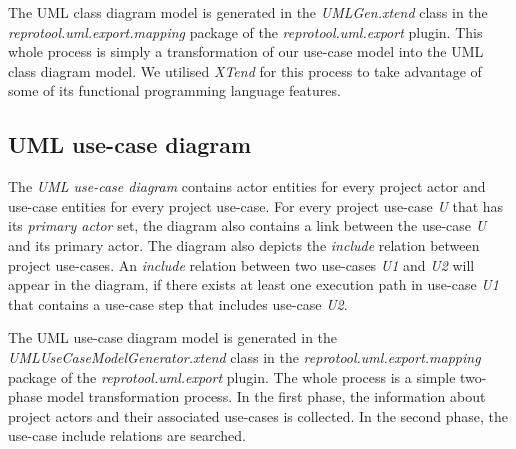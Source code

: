 The UML class diagram model is generated in the \emph{UMLGen.xtend} class in the \emph{reprotool.uml.export.mapping} package of the
\emph{reprotool.uml.export} plugin. This whole process is simply a transformation of our use-case model into the UML class diagram
model. We utilised \emph{XTend} for this process to take advantage of some of its functional programming language features.

\subsection{UML use-case diagram}
The \emph{UML use-case diagram} contains actor entities for every project actor and use-case entities for every project use-case.
For every project use-case \emph{U} that has its \emph{primary actor} set, the diagram also contains a link between the use-case \emph{U}
and its primary actor. The diagram also depicts the \emph{include} relation between project use-cases. An \emph{include} relation between
two use-cases \emph{U1} and \emph{U2} will appear in the diagram, if there exists at least one execution path in use-case \emph{U1}
that contains a use-case step that includes use-case \emph{U2}.

The UML use-case diagram model is generated in the \emph{UMLUseCaseModelGenerator.xtend} class in the \emph{reprotool.uml.export.mapping} package of the
\emph{reprotool.uml.export} plugin. The whole process is a simple two-phase model transformation process. In the first phase, the
information about project actors and their associated use-cases is collected. In the second phase, the use-case include relations are
searched.

